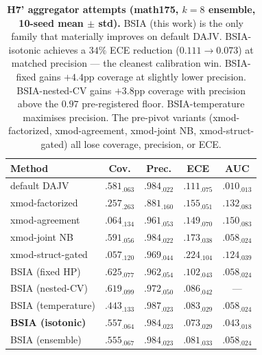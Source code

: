\begin{table}[h]
\centering
\caption{\textbf{H7' aggregator attempts (math175, $k=8$ ensemble,
10-seed mean $\pm$ std).} BSIA (this work) is the only family that
materially improves on default DAJV.  BSIA-isotonic achieves a
$34\%$ ECE reduction ($0.111 \to 0.073$) at matched precision ---
the cleanest calibration win.  BSIA-fixed gains $+4.4$pp coverage
at slightly lower precision.  BSIA-nested-CV gains $+3.8$pp
coverage with precision above the $0.97$ pre-registered floor.
BSIA-temperature maximises precision.  The pre-pivot variants
(xmod-factorized, xmod-agreement, xmod-joint NB, xmod-struct-gated)
all lose coverage, precision, or ECE.}
\label{tab:h7_negative}
\small
\setlength{\tabcolsep}{3pt}
\begin{tabular}{lcccc}
\toprule
Method & Cov. & Prec. & ECE & AUC \\
\midrule
default DAJV              & $.581_{.063}$ & $.984_{.022}$ & $.111_{.075}$ & $.010_{.013}$ \\
xmod-factorized           & $.257_{.263}$ & $.881_{.160}$ & $.155_{.051}$ & $.132_{.083}$ \\
xmod-agreement            & $.064_{.134}$ & $.961_{.053}$ & $.149_{.070}$ & $.150_{.083}$ \\
xmod-joint NB             & $.591_{.056}$ & $.984_{.022}$ & $.173_{.038}$ & $.058_{.024}$ \\
xmod-struct-gated         & $.057_{.120}$ & $.969_{.044}$ & $.224_{.104}$ & $.124_{.039}$ \\
BSIA (fixed HP)           & $\mathbf{.625_{.077}}$ & $.962_{.054}$ & $.102_{.043}$ & $.058_{.024}$ \\
BSIA (nested-CV)          & $.619_{.099}$ & $\mathbf{.972_{.050}}$ & $.086_{.042}$ & --- \\
BSIA (temperature)        & $.443_{.133}$ & $\mathbf{.987_{.023}}$ & $.083_{.029}$ & $.058_{.024}$ \\
\textbf{BSIA (isotonic)}  & $.557_{.064}$ & $.984_{.023}$ & $\mathbf{.073_{.029}}$ & $.043_{.018}$ \\
BSIA (ensemble)           & $.555_{.067}$ & $.984_{.023}$ & $.081_{.033}$ & $.058_{.024}$ \\
\bottomrule
\end{tabular}
\end{table}

